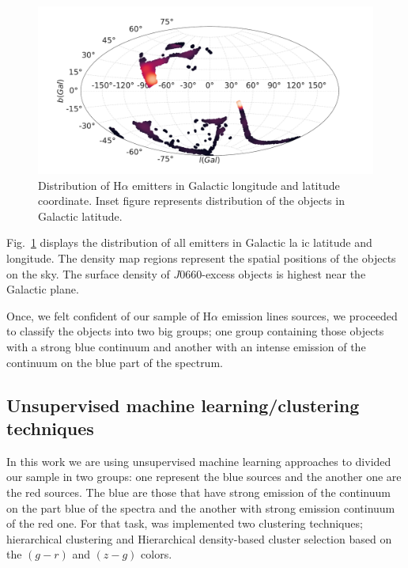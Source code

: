 \documentclass[fleqn,usenatbib]{mnras}
\begin{document}
\begin{figure}
\includegraphics[width=0.9\linewidth]{Figs/halpha-emitters-galactic-aitoff.pdf}
\centering
{}
\caption{Distribution of H{$\alpha$} emitters in Galactic longitude and latitude
  coordinate. Inset figure represents distribution of the objects in Galactic latitude.}
\label{fig:aitoff-distribution}
\end{figure}

Fig.~\ref{fig:aitoff-distribution} displays the distribution of all emitters in Galactic la
ic latitude and longitude. The density map regions represent the spatial positions of the objects
on the sky. The surface density of $J$0660-excess objects is highest near the Galactic plane.

Once, we felt confident of our sample of H{$\alpha$} emission lines sources,
we proceeded to classify the objects into two big groups; one group containing those
objects with a strong blue continuum and another with an intense emission of the
continuum on the blue part of the spectrum. 


\subsection{Unsupervised machine learning/clustering techniques}
\label{sec:clustering}

In this work we are using unsupervised machine learning approaches to divided our sample
in two groups: one represent the blue sources and the another one are the red sources.
The blue are those that have strong emission of the continuum on the part blue of the
spectra and the another with strong emission continuum of the red one. For that task,
was implemented two clustering techniques; hierarchical clustering and Hierarchical
density-based cluster selection based on the $(g - r)$ and $(z - g)$ colors.
\end{document}
